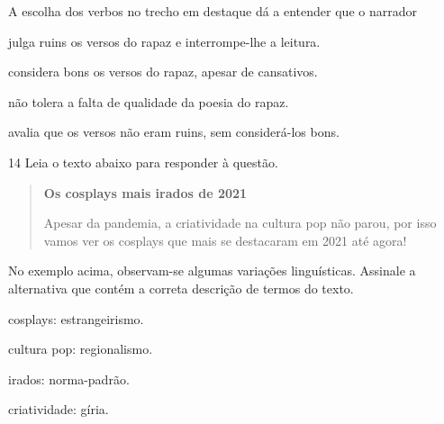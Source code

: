 
A escolha dos verbos no trecho em destaque dá a entender que o narrador

\begin{escolha}

  \item julga ruins os versos do rapaz e interrompe-lhe a leitura.

  \item considera bons os versos do rapaz, apesar de cansativos.

  \item não tolera a falta de qualidade da poesia do rapaz.

  \item avalia que os versos não eram ruins, sem considerá-los bons.

\end{escolha}

\num{14} Leia o texto abaixo para responder à questão. 

\begin{quote}

\textbf{Os cosplays mais irados de 2021}

Apesar da pandemia, a criatividade na cultura pop não parou,
por isso vamos ver os cosplays que mais se destacaram em 2021 até
agora!

\end{quote}


No exemplo acima, observam-se algumas variações linguísticas. Assinale a
alternativa que contém a correta descrição de termos do texto.

\begin{escolha}
  
  \item cosplays: estrangeirismo.
  
  \item cultura pop: regionalismo.
  
  \item irados: norma-padrão.
  
  \item criatividade: gíria.

\end{escolha}

